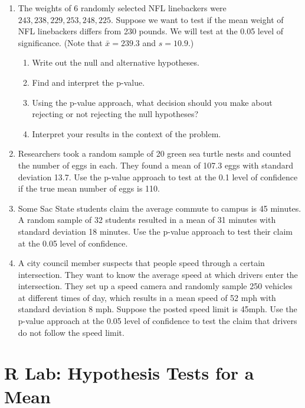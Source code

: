 \documentclass[
]{book}
\providecommand{\tightlist}{%
  \setlength{\itemsep}{0pt}\setlength{\parskip}{0pt}}
\begin{document}
\begin{enumerate}
\def\labelenumi{\arabic{enumi}.}
\tightlist
\item
  The weights of 6 randomly selected NFL linebackers were \(243, 238, 229, 253, 248, 225\). Suppose we want to test if the mean weight of NFL linebackers differs from 230 pounds. We will test at the 0.05 level of significance. (Note that \(\bar{x} = 239.3\) and \(s = 10.9\).)

  \begin{enumerate}
  \def\labelenumii{\alph{enumii}.}
  \tightlist
  \item
    Write out the null and alternative hypotheses.
  \item
    Find and interpret the p-value.
  \item
    Using the p-value approach, what decision should you make about rejecting or not rejecting the null hypotheses?
  \item
    Interpret your results in the context of the problem.
  \end{enumerate}
\item
  Researchers took a random sample of 20 green sea turtle nests and counted the number of eggs in each. They found a mean of 107.3 eggs with standard deviation 13.7. Use the p-value approach to test at the 0.1 level of confidence if the true mean number of eggs is 110.
\item
  Some Sac State students claim the average commute to campus is 45 minutes. A random sample of 32 students resulted in a mean of 31 minutes with standard deviation 18 minutes. Use the p-value approach to test their claim at the 0.05 level of confidence.
\item
  A city council member suspects that people speed through a certain intersection. They want to know the average speed at which drivers enter the intersection. They set up a speed camera and randomly sample 250 vehicles at different times of day, which results in a mean speed of 52 mph with standard deviation 8 mph. Suppose the posted speed limit is 45mph. Use the p-value approach at the 0.05 level of confidence to test the claim that drivers do not follow the speed limit.
\end{enumerate}

\section*{R Lab: Hypothesis Tests for a Mean}\label{r-lab-hypothesis-tests-for-a-mean}
\end{document}
